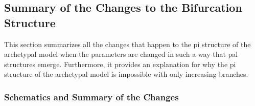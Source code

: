 \subsection{Summary of the Changes to the Bifurcation Structure}

This section summarizes all the changes that happen to the \gls{pi} structure of the archetypal model when the parameters are changed in such a way that \gls{pal} structures emerge.
Furthermore, it provides an explanation for why the \gls{pi} structure of the archetypal model is impossible with only increasing branches.

\subsubsection{Schematics and Summary of the Changes}

